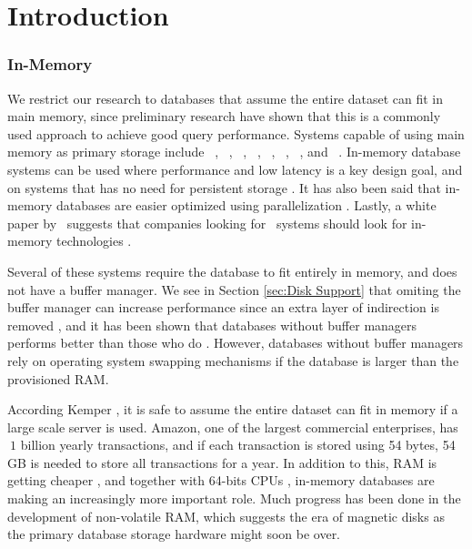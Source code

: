 \chapter{Introduction}
\label{chap:introduction}
\clearpage




\subsection{In-Memory}
\label{sub:In-Memory}
We restrict our research to databases that assume the entire dataset can fit in main memory, since preliminary research have shown that this is a commonly used approach to achieve good query performance. Systems capable of using main memory as primary storage include \oracle~\cite{Lahiri2015-mz}, \saph~\cite{Farber2012-vh}, \gorilla~\cite{Pelkonen2015-ko}, \qlikview~\cite{Qlik2011-ef}, \tableau~\cite{Kamkolkar2015-iq}, \monetdb~\cite{Boncz2002-yj}, \blink~\cite{Barber2012-xt}, and \sapnw~\cite{Lemke2010-is}. In-memory database systems can be used where performance and low latency is a key design goal, and on systems that has no need for persistent storage \cite{Zicari2012-is}. It has also been said that in-memory databases are easier optimized using parallelization \cite{Psaroudakis2013-fn}. Lastly, a white paper by \qlikview~suggests that companies looking for \bi~systems should look for in-memory technologies \cite{Bereanu2010-tj}. 

Several of these systems require the database to fit entirely in memory, and does not have a buffer manager. We see in Section \ref{sec:Disk Support} that omiting the buffer manager can increase performance since an extra layer of indirection is removed \cite{Graefe2014-ds}, and it has been shown that databases without buffer managers performs better than those who do \cite{Ferrari2012-hm}. However, databases without buffer managers rely on operating system swapping mechanisms if the database is larger than the provisioned RAM.

According Kemper \ea, it is safe to assume the entire dataset can fit in memory \cite{Kemper2011-ap} if a large scale server is used. Amazon, one of the largest commercial enterprises, has $~1$ billion yearly transactions, and if each transaction is stored using 54 bytes, 54 GB is needed to store all transactions for a year. In addition to this, RAM is getting cheaper \cite{Exasol2014-xh}, and together with 64-bits CPUs \cite{Delaney2014-ip}, in-memory databases are making an increasingly more important role. Much progress has been done in the development of non-volatile RAM, which suggests the era of magnetic disks as the primary database storage hardware might soon be over. 

